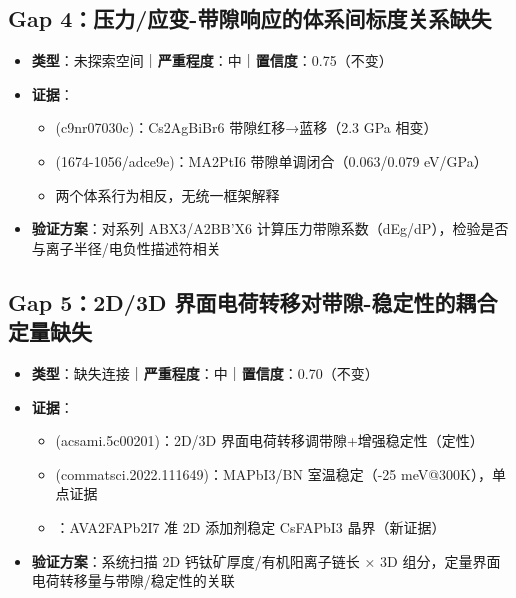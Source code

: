 \documentclass[12pt,a4paper]{ctexart}
\providecommand{\tightlist}{%
  \setlength{\itemsep}{0pt}\setlength{\parskip}{0pt}}
\begin{document}
\subsection{Gap 4：压力/应变-带隙响应的体系间标度关系缺失}\label{gap:gap-4ux538bux529bux5e94ux53d8-ux5e26ux9699ux54cdux5e94ux7684ux4f53ux7cfbux95f4ux6807ux5ea6ux5173ux7cfbux7f3aux5931}

\begin{itemize}
\tightlist
\item
  \textbf{类型}：未探索空间｜\textbf{严重程度}：中｜\textbf{置信度}：0.75（不变）
\item
  \textbf{证据}：

  \begin{itemize}
  \tightlist
  \item
    \cite{p15} (c9nr07030c)：Cs2AgBiBr6 带隙红移→蓝移（2.3 GPa 相变）
  \item
    \cite{p20} (1674-1056/adce9e)：MA2PtI6 带隙单调闭合（0.063/0.079 eV/GPa）
  \item
    两个体系行为相反，无统一框架解释
  \end{itemize}
\item
  \textbf{验证方案}：对系列 ABX3/A2BB'X6 计算压力带隙系数（dEg/dP），检验是否与离子半径/电负性描述符相关
\end{itemize}

\subsection{Gap 5：2D/3D 界面电荷转移对带隙-稳定性的耦合定量缺失}\label{gap:gap-52d3d-ux754cux9762ux7535ux8377ux8f6cux79fbux5bf9ux5e26ux9699-ux7a33ux5b9aux6027ux7684ux8026ux5408ux5b9aux91cfux7f3aux5931}

\begin{itemize}
\tightlist
\item
  \textbf{类型}：缺失连接｜\textbf{严重程度}：中｜\textbf{置信度}：0.70（不变）
\item
  \textbf{证据}：

  \begin{itemize}
  \tightlist
  \item
    \cite{p33} (acsami.5c00201)：2D/3D 界面电荷转移调带隙+增强稳定性（定性）
  \item
    \cite{p5} (commatsci.2022.111649)：MAPbI3/BN 室温稳定（-25 meV@300K），单点证据
  \item
    \cite{p55}：AVA2FAPb2I7 准 2D 添加剂稳定 CsFAPbI3 晶界（新证据）
  \end{itemize}
\item
  \textbf{验证方案}：系统扫描 2D 钙钛矿厚度/有机阳离子链长 × 3D 组分，定量界面电荷转移量与带隙/稳定性的关联
\end{itemize}
\end{document}
